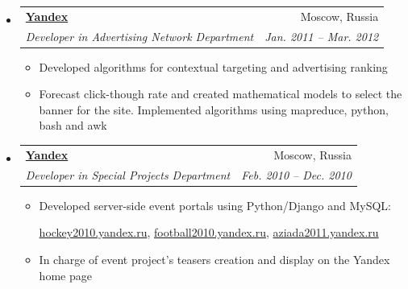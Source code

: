 \documentclass[letterpaper,11pt]{article}
\makeatletter
\newcommand{\resitem}[1]{\item #1 \vspace{-2pt}}
\newcommand{\ressubheading}[4]{
\begin{tabular*}{6.5in}{l@{\extracolsep{\fill}}r}
		\textbf{#1} & #2 \\
		\textit{#3} & \textit{#4} \\
\end{tabular*}\vspace{-6pt}}
\makeatother
\begin{document}
\begin{itemize}
\item
	\ressubheading{\href{http://yandex.com/}{Yandex}}{Moscow, Russia}{Developer in Advertising Network Department}{Jan. 2011 -- Mar. 2012}
	\begin{itemize}
		\resitem{Developed algorithms for contextual targeting and advertising ranking}
		\resitem{Forecast click-though rate and created mathematical models to select the banner for the site. Implemented algorithms using mapreduce, python, bash and awk}
	\end{itemize}

	

\item
	\ressubheading{\href{http://yandex.com/}{Yandex}}{Moscow, Russia}{Developer in Special Projects Department}{Feb. 2010 -- Dec. 2010}
	\begin{itemize}
		\resitem{Developed server-side event portals using Python/Django and MySQL:
	
	    \href{http://hockey2010.yandex.ru}{hockey2010.yandex.ru},
	    \href{http://football2010.yandex.ru}{football2010.yandex.ru},
	    \href{http://aziada2011.yandex.ru}{aziada2011.yandex.ru}}
		\resitem{In charge of event project's teasers creation and display on the Yandex home page}
	\end{itemize}
	
	
\end{itemize}
\end{document}
